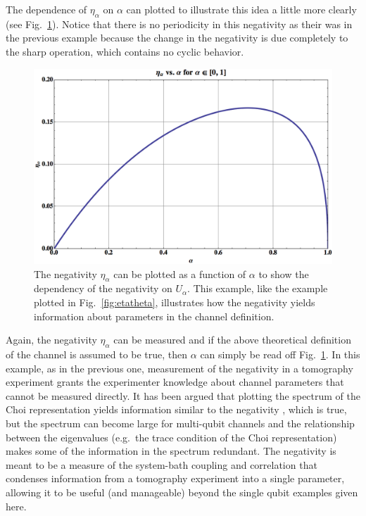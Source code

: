The dependence of $\eta_\alpha$ on $\alpha$ can plotted to illustrate this idea a little more clearly (see Fig.\ \ref{fig:etaalpha}).  Notice that there is no periodicity in this negativity as their was in the previous example because the change in the negativity is due completely to the sharp operation, which contains no cyclic behavior.   
\begin{figure}[h!t]
\centering
\includegraphics[scale=0.42]{etaalphaII.png}
\caption{The negativity $\eta_\alpha$ can be plotted as a function of $\alpha$ to show the dependency of the negativity on $U_\alpha$.  This example, like the example plotted in Fig.\ \ref{fig:etatheta}, illustrates how the negativity yields information about parameters in the channel definition.}
\label{fig:etaalpha}
\end{figure}   

Again, the negativity $\eta_\alpha$ can be measured and if the above theoretical definition of the channel is assumed to be true, then $\alpha$ can simply be read off Fig.\ \ref{fig:etaalpha}.  In this example, as in the previous one, measurement of the negativity in a tomography experiment grants the experimenter knowledge about channel parameters that cannot be measured directly.  It has been argued that plotting the spectrum of the Choi representation yields information similar to the negativity \cite{Rodriguez2008}, which is true, but the spectrum can become large for multi-qubit channels and the relationship between the eigenvalues (e.g.\ the trace condition of the Choi representation) makes some of the information in the spectrum redundant.  The negativity is meant to be a measure of the system-bath coupling and correlation that condenses information from a tomography experiment into a single parameter, allowing it to be useful (and manageable) beyond the single qubit examples given here.

